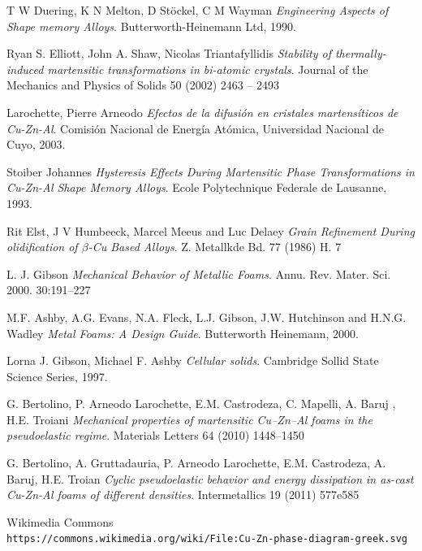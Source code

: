 \documentclass[a4paper,12pt,fleqn,twoside,openany]{book}
\begin{document}
\begin{thebibliography}{3}

T W Duering, K N Melton, D St{\"o}ckel, C M Wayman 
\textit{Engineering Aspects of Shape memory Alloys}. 
Butterworth-Heinemann Ltd, 1990.
 
Ryan S. Elliott, John A. Shaw, Nicolas Triantafyllidis
\textit{Stability of thermally-induced martensitic
transformations in bi-atomic crystals}.
Journal of the Mechanics and Physics of Solids
50 (2002) 2463 – 2493

Larochette, Pierre Arneodo 
\textit{Efectos de la difusión en cristales martensíticos de Cu-Zn-Al}. 
Comisión Nacional de Energía Atómica, Universidad Nacional de Cuyo, 2003.

Stoiber Johannes 
\textit{Hysteresis Effects During Martensitic Phase Transformations in Cu-Zn-Al Shape Memory Alloys}. 
Ecole Polytechnique Federale de Lausanne, 1993.

Rit Elst, J V Humbeeck, Marcel Meeus and Luc Delaey
\textit{Grain Refinement During olidification of $\beta$-Cu Based Alloys}.
Z. Metallkde Bd. 77 (1986) H. 7

L. J. Gibson
\textit{Mechanical Behavior of Metallic Foams}.
Annu. Rev. Mater. Sci. 2000. 30:191–227

M.F. Ashby, A.G. Evans, N.A. Fleck, L.J. Gibson,
J.W. Hutchinson and H.N.G. Wadley
\textit{Metal Foams: A Design Guide}. 
Butterworth Heinemann, 2000.


Lorna J. Gibson, Michael F. Ashby  
\textit{Cellular solids}. 
Cambridge Sollid State Science Series, 1997.

G. Bertolino, P. Arneodo Larochette, E.M. Castrodeza, C. Mapelli, A. Baruj , H.E. Troiani
\textit{Mechanical properties of martensitic Cu–Zn–Al foams in the pseudoelastic regime}.
Materials Letters 64 (2010) 1448–1450

G. Bertolino, A. Gruttadauria, P. Arneodo Larochette, E.M. Castrodeza, A. Baruj, H.E. Troian
\textit{Cyclic pseudoelastic behavior and energy dissipation in as-cast Cu-Zn-Al foams of
different densities}.
Intermetallics 19 (2011) 577e585

Wikimedia Commons
\\\texttt{https://commons.wikimedia.org/wiki/File:Cu-Zn-phase-diagram-greek.svg}
\end{thebibliography}
\end{document}
